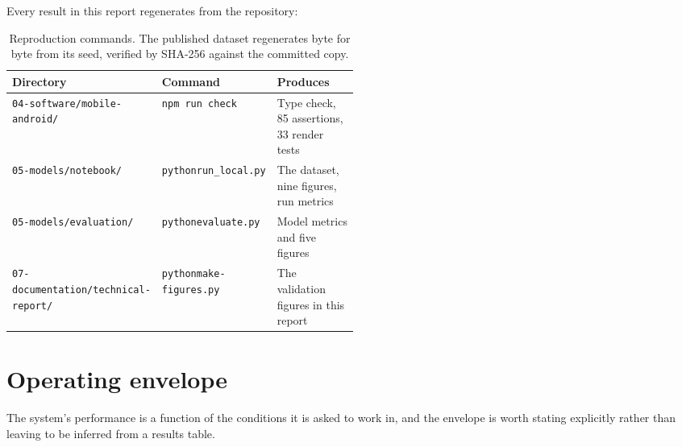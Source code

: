 \documentclass[conference,a4paper]{IEEEtran}
\begin{document}
Every result in this report regenerates from the repository:

\begin{table}[t]
\centering
\small
\begin{tabularx}{\linewidth}{L{0.27\linewidth}L{0.23\linewidth}Y}
\toprule
\textbf{Directory} & \textbf{Command} & \textbf{Produces} \\
\midrule
\texttt{04-software/}\newline\texttt{mobile-android/}
  & \texttt{npm run check}
  & Type check, 85 assertions, 33 render tests \\
\texttt{05-models/notebook/}
  & \texttt{python}\newline\texttt{run\_local.py}
  & The dataset, nine figures, run metrics \\
\texttt{05-models/evaluation/}
  & \texttt{python}\newline\texttt{evaluate.py}
  & Model metrics and five figures \\
\texttt{07-documentation/}\newline\texttt{technical-report/}
  & \texttt{python}\newline\texttt{make-figures.py}
  & The validation figures in this report \\
\bottomrule
\end{tabularx}
\caption{Reproduction commands. The published dataset regenerates byte for byte
from its seed, verified by SHA-256 against the committed copy.}
\label{tab:repro}
\end{table}

\section{Operating envelope}

The system's performance is a function of the conditions it is asked to work
in, and the envelope is worth stating explicitly rather than leaving to be
inferred from a results table.
\end{document}
